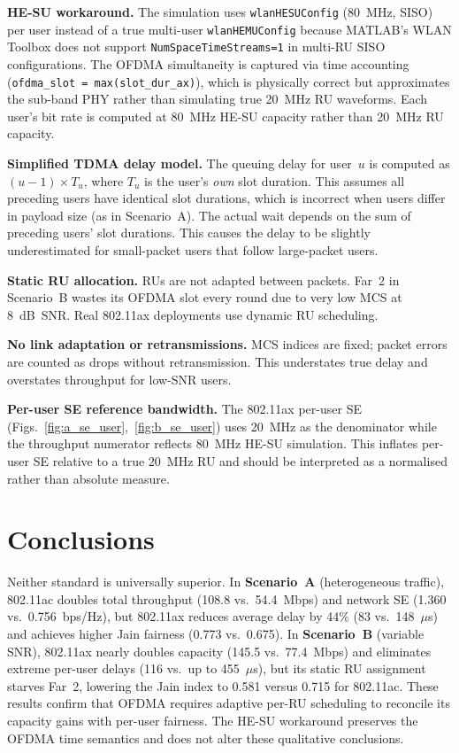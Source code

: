\documentclass[twocolumn]{article}
\begin{document}
\textbf{HE-SU workaround.} The simulation uses \texttt{wlanHESUConfig}
(80~MHz, SISO) per user instead of a true multi-user \texttt{wlanHEMUConfig}
because MATLAB's WLAN Toolbox does not support \texttt{NumSpaceTimeStreams=1}
in multi-RU SISO configurations. The OFDMA simultaneity is captured via
time accounting (\texttt{ofdma\_slot = max(slot\_dur\_ax)}), which is
physically correct but approximates the sub-band PHY rather than simulating
true 20~MHz RU waveforms. Each user's bit rate is computed at 80~MHz HE-SU
capacity rather than 20~MHz RU capacity.

\textbf{Simplified TDMA delay model.}
The queuing delay for user~$u$ is computed as $(u-1) \times T_u$, where
$T_u$ is the user's \emph{own} slot duration. This assumes all preceding
users have identical slot durations, which is incorrect when users differ
in payload size (as in Scenario~A). The actual wait depends on the sum of
preceding users' slot durations. This causes the delay to be slightly
underestimated for small-packet users that follow large-packet users.

\textbf{Static RU allocation.} RUs are not adapted between packets. Far~2
in Scenario~B wastes its OFDMA slot every round due to very low MCS at
8~dB~SNR. Real 802.11ax deployments use dynamic RU scheduling.

\textbf{No link adaptation or retransmissions.} MCS indices are fixed;
packet errors are counted as drops without retransmission. This
understates true delay and overstates throughput for low-SNR users.

\textbf{Per-user SE reference bandwidth.} The 802.11ax per-user SE
(Figs.~\ref{fig:a_se_user},~\ref{fig:b_se_user}) uses 20~MHz as the
denominator while the throughput numerator reflects 80~MHz HE-SU simulation.
This inflates per-user SE relative to a true 20~MHz RU and should be
interpreted as a normalised rather than absolute measure.

\section{Conclusions}

Neither standard is universally superior. In \textbf{Scenario~A}
(heterogeneous traffic), 802.11ac doubles total throughput
(108.8 vs.\ 54.4~Mbps) and network SE (1.360 vs.\ 0.756~bps/Hz), but
802.11ax reduces average delay by 44\% (83 vs.\ 148~$\mu$s) and achieves
higher Jain fairness (0.773 vs.\ 0.675). In \textbf{Scenario~B} (variable
SNR), 802.11ax nearly doubles capacity (145.5 vs.\ 77.4~Mbps) and
eliminates extreme per-user delays (116 vs.\ up to 455~$\mu$s), but its
static RU assignment starves Far~2, lowering the Jain index to 0.581 versus
0.715 for 802.11ac. These results confirm that OFDMA requires adaptive
per-RU scheduling to reconcile its capacity gains with per-user fairness.
The HE-SU workaround preserves the OFDMA time semantics and does not alter
these qualitative conclusions.
\end{document}
